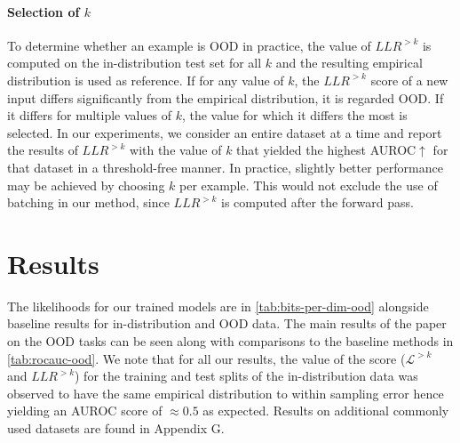 \paragraph{Selection of $k$} To determine whether an example is OOD in practice, the value of $LLR^{>k}$ is computed on the in-distribution test set for all $k$ and the resulting empirical distribution is used as reference.
If for any value of $k$, the $LLR^{>k}$ score of a new input differs significantly from the empirical distribution, it is regarded OOD.
If it differs for multiple values of $k$, the value for which it differs the most is selected.
In our experiments, we consider an entire dataset at a time and report the results of $LLR^{>k}$ with the value of $k$ that yielded the highest AUROC$\uparrow$ for that dataset in a threshold-free manner.
In practice, slightly better performance may be achieved by choosing $k$ per example.
This would not exclude the use of batching in our method, since $LLR^{>k}$ is computed after the forward pass.


\section{Results}

The likelihoods for our trained models are in \cref{tab:bits-per-dim-ood} alongside baseline results for in-distribution and OOD data.
The main results of the paper on the OOD tasks can be seen along with comparisons to the baseline methods in \cref{tab:rocauc-ood}.
We note that for all our results, the value of the score ($\mathcal{L}^{>k}$ and $LLR^{>k}$) for the training and test splits of the in-distribution data was observed to have the same empirical distribution to within sampling error hence yielding an AUROC score of $\approx0.5$ as expected.
Results on additional commonly used datasets are found in Appendix G.


